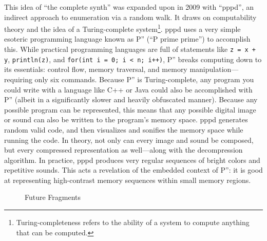 \documentclass{thesis}
\begin{document}
This idea of ``the complete synth'' was expanded upon in 2009 with ``pppd''\cite{kyle_mcdonald_pppd_2009}, an indirect approach to enumeration via a random walk. It draws on computability theory\cite{boolos_computability_2002} and the idea of a Turing-complete system\footnote{Turing-completeness refers to the ability of a system to compute anything that can be computed.}. pppd uses a very simple esoteric programming language known as P'' (``P prime prime'') to accomplish this. While practical programming languages are full of statements like \verb!z = x + y!, \verb!println(z)!, and \verb!for(int i = 0; i < n; i++)!, P'' breaks computing down to its essentials: control flow, memory traversal, and memory manipulation---requiring only six commands. Because P'' is Turing-complete, any program you could write with a language like C++ or Java could also be accomplished with P'' (albeit in a significantly slower and heavily obfuscated manner). Because any possible program can be represented, this means that any possible digital image or sound can also be written to the program's memory space. pppd generates random valid code, and then visualizes and sonifies the memory space while running the code. In theory, not only can every image and sound be composed, but every compressed representation as well---along with the decompression algorithm. In practice, pppd produces very regular sequences of bright colors and repetitive sounds. This acts a revelation of the embedded context of P'': it is good at representing high-contrast memory sequences within small memory regions.

\begin{figure}
  \begin{center}
	  \caption{Future Fragments}
	  \label{future-fragments}
  \end{center}
\end{figure}
\end{document}
